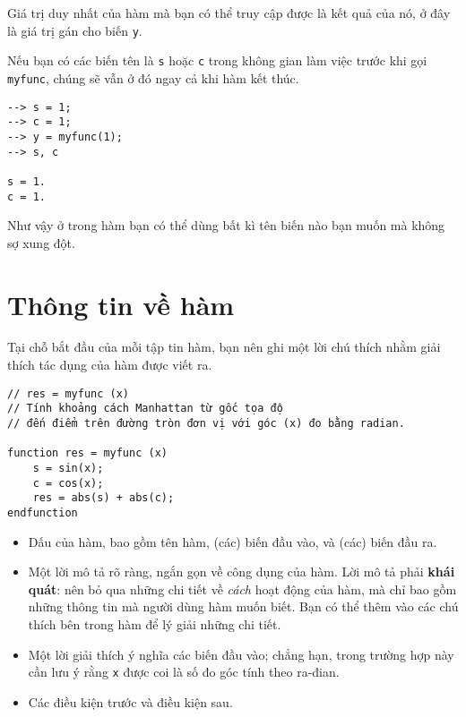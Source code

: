 \documentclass[12pt]{book}
\begin{document}
Giá trị duy nhất của hàm mà bạn có thể truy cập được là kết quả của
nó, ở đây là giá trị gán cho biến {\tt y}.

Nếu bạn có các biến tên là {\tt s} hoặc {\tt c} trong không gian
làm việc trước khi gọi {\tt myfunc}, chúng sẽ vẫn ở đó ngay cả khi
hàm kết thúc.

\begin{verbatim}
--> s = 1;
--> c = 1;
--> y = myfunc(1);
--> s, c

s = 1.
c = 1.
\end{verbatim}

Như vậy ở trong hàm bạn có thể dùng bất kì tên biến nào bạn muốn
mà không sợ xung đột.


\section{Thông tin về hàm}

Tại chỗ bắt đầu của mỗi tập tin hàm, bạn nên ghi một lời chú thích
nhằm giải thích tác dụng của hàm được viết ra.

\begin{verbatim}
// res = myfunc (x)
// Tính khoảng cách Manhattan từ gốc tọa độ
// đến điểm trên đường tròn đơn vị với góc (x) đo bằng radian.

function res = myfunc (x)
    s = sin(x);
    c = cos(x);
    res = abs(s) + abs(c);
endfunction
\end{verbatim}

%
%

\begin{itemize}

\item Dấu của hàm, bao gồm tên hàm, (các) biến đầu vào, và
(các) biến đầu ra.

\item Một lời mô tả rõ ràng, ngắn gọn về công dụng của hàm. 
Lời mô tả phải {\bf khái quát}: nên bỏ qua những chi tiết về
{\em cách} hoạt động của hàm, mà chỉ bao gồm những thông tin 
mà người dùng hàm muốn biết. Bạn có thể thêm vào các chú thích
bên trong hàm để lý giải những chi tiết.

\item Một lời giải thích ý nghĩa các biến đầu vào; chẳng hạn,
trong trường hợp này cần lưu ý rằng {\tt x} được coi là số đo góc
tính theo ra-đian.

\item Các điều kiện trước và điều kiện sau.

\end{itemize}
\end{document}
